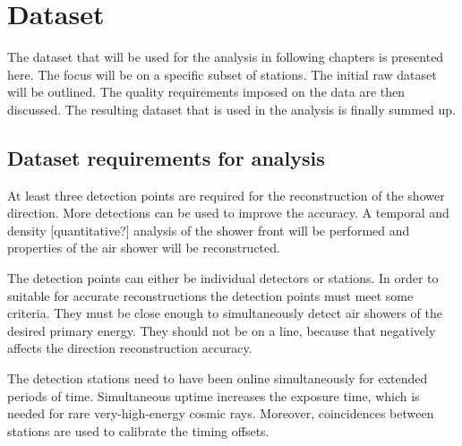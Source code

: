 \chapter{Dataset}
\label{ch:dataset}


The dataset that will be used for the analysis in following chapters is presented here. The focus will be on a specific subset of stations. The initial raw dataset will be outlined. The quality requirements imposed on the data are then discussed. The resulting dataset that is used in the analysis is finally summed up.


\section{Dataset requirements for analysis}

At least three detection points are required for the reconstruction of the shower direction. More detections can be used to improve the accuracy. A temporal and density [quantitative?] analysis of the shower front will be performed and properties of the air shower will be reconstructed.

The detection points can either be individual \hisparc detectors or \hisparc stations. In order to suitable for accurate reconstructions the detection points must meet some criteria. They must be close enough to simultaneously detect air showers of the desired primary energy. They should not be on a line, because that negatively affects the direction reconstruction accuracy.

The detection stations need to have been online simultaneously for extended periods of time. Simultaneous uptime increases the exposure time, which is needed for rare very-high-energy cosmic rays. Moreover, coincidences between stations are used to calibrate the timing offsets.

